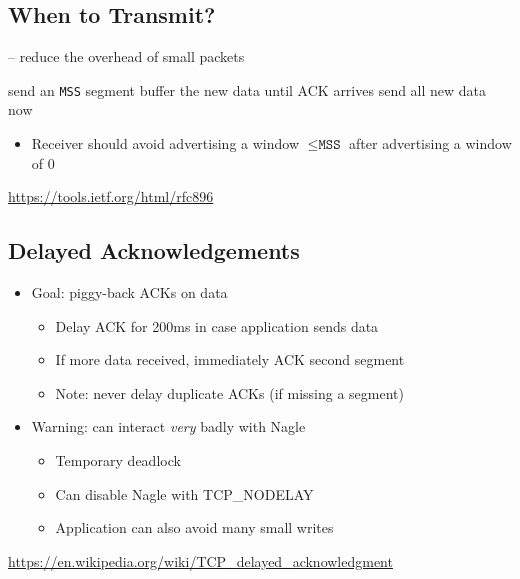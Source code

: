 \subsection{When to Transmit?}
\begin{algorithm}[H]
    \caption[Nagle's Algorithm]{ -- reduce the overhead of small packets}
    \label{alg:nagle}
    \begin{algorithmic}[1]
        \State send an \texttt{MSS} segment
        \Else
        \State buffer the new data until ACK arrives
        \Else
        \State send all new data now
        \EndIf
        \EndIf
    \end{algorithmic}
\end{algorithm}
\begin{itemize}[nosep]
    \item Receiver should avoid advertising a window $\leq\texttt{MSS}$ after advertising a window of 0
\end{itemize}
\url{https://tools.ietf.org/html/rfc896}

\subsection{Delayed Acknowledgements}
\begin{itemize}[nosep]
    \item Goal: piggy-back ACKs on data
          \begin{itemize}[nosep]
              \item Delay ACK for 200ms in case application sends data
              \item If more data received, immediately ACK second segment
              \item Note: never delay duplicate ACKs (if missing a segment)
          \end{itemize}
    \item Warning: can interact \emph{very} badly with Nagle
          \begin{itemize}[nosep]
              \item Temporary deadlock
              \item Can disable Nagle with TCP\_NODELAY
              \item Application can also avoid many small writes
          \end{itemize}
\end{itemize}
\url{https://en.wikipedia.org/wiki/TCP_delayed_acknowledgment}

